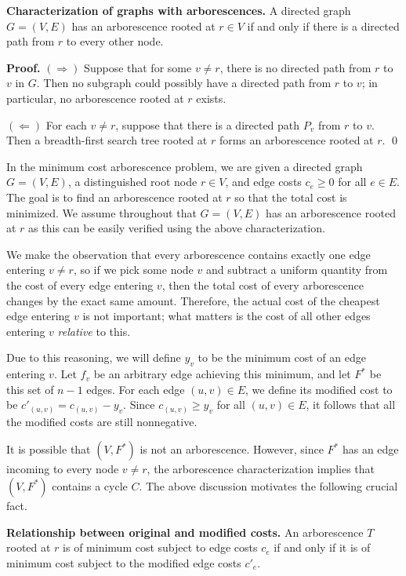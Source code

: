 \documentclass{article}
\begin{document}
{\color{violet} 
{\bf Characterization of graphs with arborescences.} A directed graph $G = (V, E)$ 
has an arborescence rooted at $r \in V$ if and only if there is a 
directed path from $r$ to every other node. 
}

{\color{blue}
{\bf Proof.} $(\Rightarrow)$ Suppose that for some $v \neq r$, there 
is no directed path from $r$ to $v$ in $G$. Then no subgraph could possibly 
have a directed path from $r$ to $v$; in particular, no arborescence 
rooted at $r$ exists.

$(\Leftarrow)$ For each $v \neq r$, suppose that there is a directed path $P_v$
from $r$ to $v$. Then a breadth-first search tree rooted at $r$ forms 
an arborescence rooted at $r$. \qed 
}

In the minimum cost arborescence problem, we are given a directed graph 
$G = (V, E)$, a distinguished root node $r \in V$, and edge costs $c_e \geq 0$ for all $e \in E$. 
The goal is to find an arborescence rooted at $r$ so that the total cost is 
minimized. We assume throughout that $G = (V, E)$ has an arborescence rooted at $r$ 
as this can be easily verified using the above characterization. 

We make the observation that every arborescence contains exactly one 
edge entering $v \neq r$, so if we pick some node $v$ and subtract a 
uniform quantity from the cost of every edge entering $v$, then the total 
cost of every arborescence changes by the exact same amount. Therefore, 
the actual cost of the cheapest edge entering $v$ is not important; 
what matters is the cost of all other edges entering $v$ \emph{relative} to this.

Due to this reasoning, we will define $y_v$ to be the minimum cost 
of an edge entering $v$. Let $f_v$ be an arbitrary edge achieving this minimum, 
and let $F^*$ be this set of $n-1$ edges.
For each edge $(u, v) \in E$, we define its modified cost to be 
$c'_{(u, v)} = c_{(u, v)} - y_v$. Since $c_{(u, v)} \geq y_v$ for all 
$(u, v) \in E$, it follows that all the modified costs are 
still nonnegative.

It is possible that $(V, F^*)$ is not an arborescence. However, since $F^*$ 
has an edge incoming to every node $v \neq r$, the arborescence 
characterization implies that $(V, F^*)$ contains a cycle $C$. 
The above discussion motivates the following crucial fact. 

{\color{violet}
{\bf Relationship between original and modified costs.} An arborescence $T$ 
rooted at $r$ is of minimum cost subject to edge costs $c_e$ if and only if 
it is of minimum cost subject to the modified edge costs $c'_e$. 
}
\end{document}
